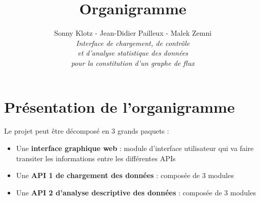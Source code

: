 
\geometry{top=3cm,bottom=3cm}

\title{\vspace{\fill}\textbf{\Huge Organigramme}}
\author{Sonny Klotz - Jean-Didier Pailleux - Malek Zemni\vspace{2em}\\\textit{Interface de chargement, de contrôle}\\\textit{et d’analyse statistique des données}\\\textit{pour la constitution d’un graphe de flux}\vspace{2em}}


\clearpage
\maketitle\vspace{\fill}
\newpage\clearpage{}
	
	\section{Présentation de l'organigramme}
		Le projet peut être décomposé en 3 grands paquets :
		\begin{itemize}
		\item Une \textbf{interface graphique web} : module d'interface utilisateur qui va faire transiter les informations entre les différentes APIs
		\item Une \textbf{API 1 de chargement des données} : composée de 3 modules
		\item Une \textbf{API 2 d'analyse descriptive des données} : composée de 3 modules
		\end{itemize}
		
